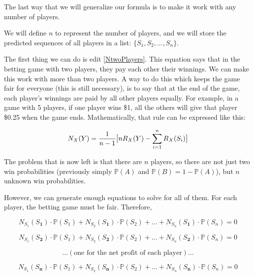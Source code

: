 \documentclass[english,12pt,a4paper,final]{article}
\begin{document}
The last way that we will generalize our formula is to make it work with any number of players.

We will define $n$ to represent the number of players, and we will store the predicted sequences of all players in a list: $\{S_1, S_2, ..., S_n\}$.

The first thing we can do is edit \eqref{NtwoPlayers}. This equation says that in the betting game with two players, they pay each other their winnings. We can make this work with more than two players. A way to do this which keeps the game fair for everyone (this is still necessary), is to say that at the end of the game, each player's winnings are paid by all other players equally. For example, in a game with 5 players, if one player wins \$1, all the others will give that player \$0.25 when the game ends. Mathematically, that rule can be expressed like this:

\begin{equation}\label{Ndef}
	N_{X}(Y) = \frac{1}{n-1} \mathlarger{[}nR_{X}(Y) - \sum_{i=1}^{n}R_{X}(S_i)\mathlarger{]}
\end{equation}

The problem that is now left is that there are $n$ players, so there are not just two win probabilities (previously simply $\mathbb{P}(A)$ and $\mathbb{P}(B) = 1-\mathbb{P}(A)$), but $n$ unknown win probabilities.

However, we can generate enough equations to solve for all of them. For each player, the betting game must be fair. Therefore,

\begin{equation*}
	N_{S_1}(S_\textbf{1}) \cdot \mathbb{P}(S_1) + N_{S_2}(S_\textbf{1}) \cdot \mathbb{P}(S_2) + ... + N_{S_n}(S_\textbf{1}) \cdot \mathbb{P}(S_n) = 0
\end{equation*}

\begin{equation*}
	N_{S_1}(S_\textbf{2}) \cdot \mathbb{P}(S_1) + N_{S_2}(S_\textbf{2}) \cdot \mathbb{P}(S_2) + ... + N_{S_n}(S_\textbf{2}) \cdot \mathbb{P}(S_n) = 0
\end{equation*}

\begin{equation*}
	...(\text{one for the net profit of each player})...
\end{equation*}

\begin{equation*}
	N_{S_1}(S_\textbf{n}) \cdot \mathbb{P}(S_1) + N_{S_2}(S_\textbf{n}) \cdot \mathbb{P}(S_2) + ... + N_{S_n}(S_\textbf{n}) \cdot \mathbb{P}(S_n) = 0
\end{equation*}
\end{document}
